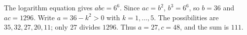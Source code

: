 The logarithm equation gives $abc=6^6$. Since $ac=b^2$, $b^3=6^6$, so $b=36$ and $ac=1296$. Write $a=36-k^2>0$ with $k=1,\ldots,5$. The possibilities are $35,32,27,20,11$; only $27$ divides $1296$. Thus $a=27,c=48$, and the sum is $\boxed{111}$.
